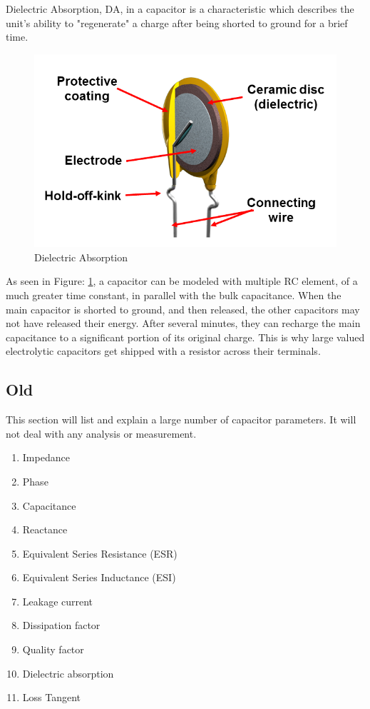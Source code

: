 Dielectric Absorption, DA, in a capacitor is a characteristic which describes the unit's ability to "regenerate" a charge after being shorted to ground for a brief time.

\begin{figure}
    \includegraphics[keepaspectratio=true,scale=.5]{./figures/testImage.png}
    \centering
    \caption{Dielectric Absorption}
    \label{daPlot}
\end{figure}

As seen in Figure: \ref{daPlot}, a capacitor can be modeled with multiple RC element, of a much greater time constant, in parallel with the bulk capacitance. When the main capacitor is shorted to ground, and then released, the other capacitors may not have released their energy. After several minutes, they can recharge the main capacitance to a significant portion of its original charge. This is why large valued electrolytic capacitors get shipped with a resistor across their terminals.

\subsection{Old}

This section will list and explain a large number of capacitor parameters. It will not deal with any analysis or measurement.

\begin {enumerate}
    \item Impedance
    \item Phase
    \item Capacitance
    \item Reactance
    \item Equivalent Series Resistance (ESR)
    \item Equivalent Series Inductance (ESI)
    \item Leakage current
    \item Dissipation factor
    \item Quality factor
    \item Dielectric absorption
    \item Loss Tangent
\end {enumerate}
